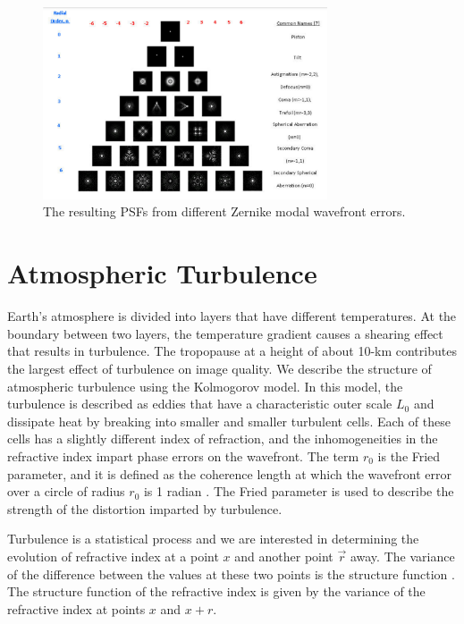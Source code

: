 \begin{figure}
    \centering
    \includegraphics[width=0.75\textwidth]{Chapter Materials/Introduction Materials/Introduction Figures/ZernikePSFs.png}
    \caption{The resulting PSFs from different Zernike modal wavefront errors.}
    \label{fig:zernikePSFs}
\end{figure}

\section{Atmospheric Turbulence}


Earth’s atmosphere is divided into layers that have different temperatures. At the boundary between two layers, the temperature gradient causes a shearing effect that results in turbulence. The tropopause at a height of about 10-km contributes the largest effect of turbulence on image quality. We describe the structure of atmospheric turbulence using the Kolmogorov model. In this model, the turbulence is described as eddies that have a characteristic outer scale $L_0$ and dissipate heat by breaking into smaller and smaller turbulent cells. Each of these cells has a slightly different index of refraction, and the inhomogeneities in the refractive index impart phase errors on the wavefront. The term $r_0$ is the Fried parameter, and it is defined as the coherence length at which the wavefront error over a circle of radius $r_0$ is 1 radian \citep{roddier1999adaptive}. The Fried parameter is used to describe the strength of the distortion imparted by turbulence.  

Turbulence is a statistical process and we are interested in determining the evolution of refractive index at a point $x$ and another point $\Vec{r}$ away. The variance of the difference between the values at these two points is the structure function \citep{hardy}. The structure function of the refractive index is given by the variance of the refractive index at points $x$ and $x+r$.   

